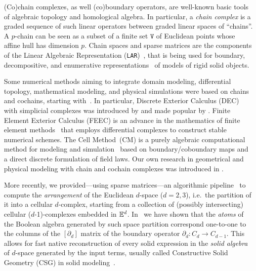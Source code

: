(Co)chain complexes, as well (co)boundary operators, are well-known
basic tools of algebraic topology and homological algebra. In
particular, a \emph{chain complex} is a graded sequence of such linear
operators between graded linear spaces of ``chains''. A $p$-chain can be seen as a subset of a finite set $\texttt{V}$ of Euclidean points whose affine hull has dimension $p$.
Chain spaces and sparse matrices are the components of the Linear Algebraic
Representation (\texttt{LAR})~\cite{Dicarlo:2014:TNL:2543138.2543294}, that is being used for
boundary, decompositive, and enumerative
representations~\cite{Requicha:1980:RRS:356827.356833} of models of rigid solid objects.

Some numerical methods aiming to integrate domain modeling, differential
topology, mathematical modeling, and physical simulations were based on chains and
cochains, starting with~\cite{PALMER1995733,Palmer1993}. In particular,
Discrete Exterior Calculus (DEC) with simplicial complexes was
introduced by \cite{Hirani:2003:DEC:959640} and made popular by
\cite{Desbrun:2006:DDF:1185657.1185665,Elcott:2006:BYO:1185657.1185666}.
Finite Element Exterior Calculus 
(FEEC) is an advance in the mathematics of finite element 
methods~\cite{arnold_falk_winther_2006,Arnold:2010,Arnold:2018} that employs differential
complexes to construct stable numerical schemes. The Cell
Method~(CM) is a purely algebraic computational method
for modeling and
simulation~\cite{Tonti:1975,Tonti:2013,Ferretti:2014}
based on boundary/coboundary maps and a direct discrete formulation of
field laws. Our own research in geometrical and physical modeling with
chain and cochain complexes was introduced in
\cite{DiCarlo:2009:DPU:1629255.1629273,ieee-tase,Dicarlo:2014:TNL:2543138.2543294}.

More recently, we provided---using sparse
matrices---an algorithmic pipeline~\cite{TSAS:19} to compute the \emph{arrangement} of the
Euclidean \(d\)-space (\(d=2,3\)), i.e.~the partition of
it into a cellular \(d\)-complex, starting from a collection of (possibly intersecting) cellular
(\(d\)-1)-complexes embedded in \(\mathbb{E}^d\). In~\cite{paoluzzi2019finite} we
have shown that the \emph{atoms} of the Boolean algebra generated by
such space partition correspond one-to-one to the columns of the $[\partial_d]$ matrix
of the boundary operator \(\partial_d : C_d \to C_{d-1}\). This allows for fast
native reconstruction of every solid expression in the \emph{solid algebra} of
\(d\)-space generated by the input terms, usually called Constructive Solid Geometry (CSG)
in solid modeling~\cite{Requicha:1980:RRS:356827.356833}.

